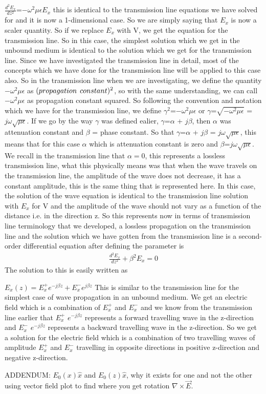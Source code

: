 $\frac{d^2 E_x}{d z^2}$=$-\omega^2\mu\epsilon E_{x}$ this is identical to the transmission line equations we have solved for and it is now a 1-dimensional case. So we are simply saying that $E_x$ is now a scaler quantity. So if we replace $E_x$ with V, we get the equation for the transmission line. So in this case, the simplest solution which we get in the unbound medium is identical to the solution which we get for the transmission line. Since we have investigated the transmission line in detail, most of the concepts which we have done for the transmission line will be applied to this case also. So in the transmission line when we are investigating, we define the quantity $-\omega^2\mu\epsilon$ as $(propagation\hspace{0.15cm} constant)^2$, so with the same understanding, we can call $-\omega^2\mu\epsilon$ as propagation constant squared. So following the convention and notation which we have for the transmission line, we define $\gamma^2$=$-\omega^2\mu\epsilon$ or $\gamma$=$\sqrt{-\omega^2\mu\epsilon}$ = $j\omega\sqrt{\mu\epsilon}$. If we go by the way $\gamma$ was defined ealier, $\gamma$=$\alpha$ + $j\beta$, then $\alpha$ was attenuation constant and $\beta$ = phase constant. So that $\gamma$=$\alpha$ + $j\beta$ = $j\omega\sqrt{\mu\epsilon}$, this means that for this case $\alpha$ which is attenuation constant is zero and  $\beta$=$j\omega\sqrt{\mu\epsilon}$.
We recall in the transmission line that $\alpha=0$, this represents a lossless transmission line, what this physically means was that when the wave travels on the transmission line, the amplitude of the wave does not decrease, it has a constant amplitude, this is the same thing that is represented here. In this case, the solution of the wave equation is identical to the transmission line solution with $E_x$ for V and the amplitude of the wave should not vary as a function of the distance i.e. in the direction z. So this represents now in terms of transmission line terminology that we developed, a lossless propagation on the transmission line and the solution which we have gotten from the transmission line is a second-order differential equation after defining the parameter is
\begin{align}
\frac{d^2E_x}{dz^2}+\beta^2E_x=0
\end{align}
The solution to this is easily written as

$E_x(z)=E^+_xe^{-j\beta z}+E^-_xe^{j\beta z}$ This is similar to the transmission line for the simplest case of wave propagation in an unbound medium.
We get an electric field which is a combination of $E_x^+$ and $E_x^-$ and we know from the transmission line earlier that $E_x^+$ $e^{-j\beta z}$ represents a forward travelling wave in the z-direction and $E_x^-$ $e^{-j\beta z}$ represents a backward travelling wave in the z-direction. So we get a solution for the electric field which is a combination of two travelling waves of amplitude $E_x^+$ and $E_x^-$ travelling in opposite directions in positive z-direction and negative z-direction.

ADDENDUM: $E_0(x)\hat{x}$ and $E_0(z)\hat{x}$, why it exists for one and not the other using vector field plot to find where you get rotation $\nabla\times\vec{E}$.
